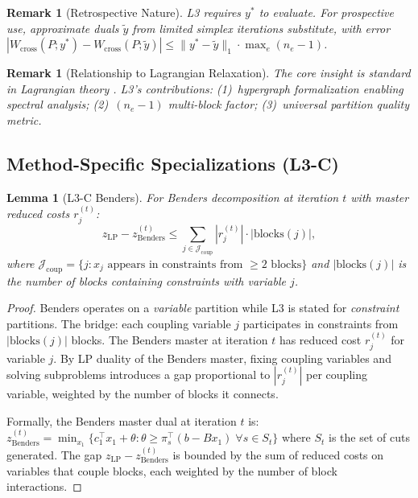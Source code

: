 \documentclass[12pt]{article}
\newtheorem{lemma}[theorem]{Lemma}
\newtheorem{remark}[theorem]{Remark}
\begin{document}
\begin{remark}[Retrospective Nature]
L3 requires $y^*$ to evaluate.  For prospective use, approximate duals
$\tilde{y}$ from limited simplex iterations substitute, with error
$|W_{\mathrm{cross}}(P; y^*) - W_{\mathrm{cross}}(P; \tilde{y})| \leq
\|y^* - \tilde{y}\|_1 \cdot \max_e (n_e - 1)$.
\end{remark}

\begin{remark}[Relationship to Lagrangian Relaxation]
The core insight is standard in Lagrangian theory
\citep{fisher1981lagrangian,geoffrion1974lagrangean}.
L3's contributions: (1)~hypergraph formalization enabling spectral analysis;
(2)~$(n_e - 1)$ multi-block factor; (3)~universal partition quality metric.
\end{remark}

\subsection{Method-Specific Specializations (L3-C)}
\label{sec:L3C}

\begin{lemma}[L3-C Benders]
\label{lem:L3C-benders}
For Benders decomposition at iteration $t$ with master reduced costs $r_j^{(t)}$:
\begin{equation}\label{eq:L3C-benders}
  z_{\mathrm{LP}} - z_{\mathrm{Benders}}^{(t)} \leq
  \sum_{j \in \mathcal{J}_{\mathrm{coup}}} |r_j^{(t)}| \cdot |\mathrm{blocks}(j)|,
\end{equation}
where $\mathcal{J}_{\mathrm{coup}} = \{j : x_j \text{ appears in constraints from } \geq 2 \text{ blocks}\}$
and $|\mathrm{blocks}(j)|$ is the number of blocks containing constraints with variable $j$.
\end{lemma}

\begin{proof}
Benders operates on a \emph{variable} partition while L3 is stated for
\emph{constraint} partitions.  The bridge: each coupling variable $j$
participates in constraints from $|\mathrm{blocks}(j)|$ blocks.  The Benders
master at iteration $t$ has reduced cost $r_j^{(t)}$ for variable $j$.
By LP duality of the Benders master, fixing coupling variables and solving
subproblems introduces a gap proportional to $|r_j^{(t)}|$ per coupling
variable, weighted by the number of blocks it connects.

Formally, the Benders master dual at iteration $t$ is:
$z_{\mathrm{Benders}}^{(t)} = \min_{x_1} \{c_1^\top x_1 + \theta : \theta \geq \pi_s^\top (b - B x_1)\;\forall s \in S_t\}$
where $S_t$ is the set of cuts generated.  The gap
$z_{\mathrm{LP}} - z_{\mathrm{Benders}}^{(t)}$ is bounded by the sum of
reduced costs on variables that couple blocks, each weighted by the number
of block interactions.
\end{proof}
\end{document}
